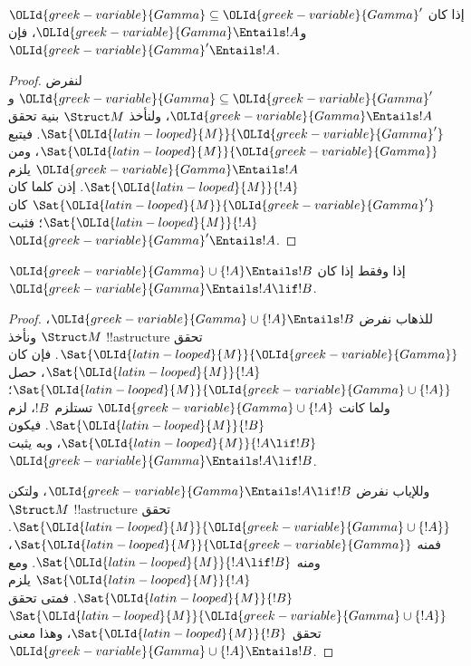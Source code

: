 \documentclass[../../../include/open-logic-section]{subfiles}
\begin{document}
\begin{prop}
إذا كان ${\OLId{greek-variable}{Gamma}} \subseteq {\OLId{greek-variable}{Gamma}}'$ و${\OLId{greek-variable}{Gamma}} \Entails !A$، فإن
${\OLId{greek-variable}{Gamma}}' \Entails !A$.
\end{prop}

\begin{proof}
لنفرض ${\OLId{greek-variable}{Gamma}} \subseteq {\OLId{greek-variable}{Gamma}}'$ و${\OLId{greek-variable}{Gamma}} \Entails !A$،
ولنأخذ $\Struct M$ بنية تحقق $\Sat{{\OLId{latin-looped}{M}}}{{\OLId{greek-variable}{Gamma}}'}$.
فيتبع $\Sat{{\OLId{latin-looped}{M}}}{{\OLId{greek-variable}{Gamma}}}$، ومن ${\OLId{greek-variable}{Gamma}} \Entails !A$ يلزم
$\Sat{{\OLId{latin-looped}{M}}}{!A}$. إذن كلما كان $\Sat{{\OLId{latin-looped}{M}}}{{\OLId{greek-variable}{Gamma}}'}$ كان
$\Sat{{\OLId{latin-looped}{M}}}{!A}$؛ فثبت ${\OLId{greek-variable}{Gamma}}' \Entails !A$.
\end{proof}


\begin{thm}
${\OLId{greek-variable}{Gamma}} \cup \{!A\} \Entails !B$ إذا وفقط إذا كان
${\OLId{greek-variable}{Gamma}} \Entails !A \lif !B$.
\end{thm}

\begin{proof}
للذهاب نفرض
${\OLId{greek-variable}{Gamma}} \cup \{ !A \} \Entails !B$، ونأخذ $\Struct M$
!!a{structure} تحقق $\Sat{{\OLId{latin-looped}{M}}}{{\OLId{greek-variable}{Gamma}}}$. فإن كان $\Sat{{\OLId{latin-looped}{M}}}{!A}$،
حصل $\Sat{{\OLId{latin-looped}{M}}}{{\OLId{greek-variable}{Gamma}} \cup \{ !A \} }$؛ ولما كانت
${\OLId{greek-variable}{Gamma}} \cup \{ !A \}$ تستلزم~$!B$، لزم $\Sat{{\OLId{latin-looped}{M}}}{!B}$.
فيكون $\Sat{{\OLId{latin-looped}{M}}}{!A \lif !B}$، وبه يثبت
${\OLId{greek-variable}{Gamma}} \Entails !A \lif !B$.

وللإياب نفرض ${\OLId{greek-variable}{Gamma}} \Entails !A \lif !B$، ولتكن
$\Struct M$ !!a{structure} تحقق
$\Sat{{\OLId{latin-looped}{M}}}{{\OLId{greek-variable}{Gamma}} \cup \{ !A \}}$. فمنه $\Sat{{\OLId{latin-looped}{M}}}{{\OLId{greek-variable}{Gamma}}}$،
ومنه $\Sat{{\OLId{latin-looped}{M}}}{!A \lif !B}$. ومع $\Sat{{\OLId{latin-looped}{M}}}{!A}$ يلزم
$\Sat{{\OLId{latin-looped}{M}}}{!B}$. فمتى تحقق
$\Sat{{\OLId{latin-looped}{M}}}{{\OLId{greek-variable}{Gamma}} \cup \{ !A \} }$ تحقق $\Sat{{\OLId{latin-looped}{M}}}{!B}$،
وهذا معنى ${\OLId{greek-variable}{Gamma}} \cup \{ !A \} \Entails !B$.
\end{proof}
\end{document}
